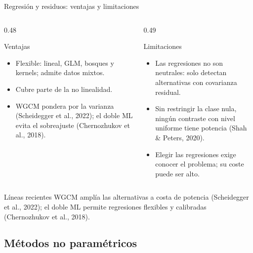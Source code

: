 \documentclass[aspectratio=169,11pt]{beamer}
\newcommand{\srccite}[1]{{\scriptsize\color{upmgray}(#1)}}
\begin{document}
\begin{frame}[t]{Regresión y residuos: ventajas y limitaciones}
  \begin{columns}[T,onlytextwidth]
    \begin{column}{0.48\textwidth}
      \begin{block}{Ventajas}
        \begin{itemize}
          \item Flexible: lineal, GLM, bosques y kernels; admite datos mixtos.
          \item Cubre parte de la no linealidad.
          \item WGCM pondera por la varianza \srccite{Scheidegger et al., 2022};
                el doble ML evita el sobreajuste \srccite{Chernozhukov et al.,
                2018}.
        \end{itemize}
      \end{block}
    \end{column}
    \begin{column}{0.49\textwidth}
      \begin{alertblock}{Limitaciones}
        \begin{itemize}
          \item Las regresiones no son neutrales: solo detectan alternativas
                con covarianza residual.
          \item Sin restringir la clase nula, ningún contraste con nivel
                uniforme tiene potencia (Shah \& Peters, 2020).
          \item Elegir las regresiones exige conocer el problema; su coste
                puede ser alto.
        \end{itemize}
      \end{alertblock}
    \end{column}
  \end{columns}
  \begin{exampleblock}{Líneas recientes}
    WGCM amplía las alternativas a costa de potencia
    \srccite{Scheidegger et al., 2022}; el doble ML permite regresiones
    flexibles y calibradas \srccite{Chernozhukov et al., 2018}.
  \end{exampleblock}
\end{frame}

\subsection{Métodos no paramétricos}
\end{document}
